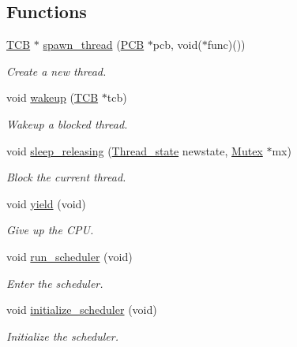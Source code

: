 \subsection*{Functions}
\begin{DoxyCompactItemize}
\item 
\hyperlink{group__scheduler_gaf88d9c946bf70b36a1e8bc34383abfc9}{T\-C\-B} $\ast$ \hyperlink{group__scheduler_ga34517ad777ad754965f80fe0248c16e5}{spawn\-\_\-thread} (\hyperlink{group__proc_gadf327f09ee935cf1734c14e8849f0421}{P\-C\-B} $\ast$pcb, void($\ast$func)())
\begin{DoxyCompactList}\small\item\em Create a new thread. \end{DoxyCompactList}\item 
void \hyperlink{group__scheduler_ga813d6e8ee69aed65bc5c317b99cfa51e}{wakeup} (\hyperlink{group__scheduler_gaf88d9c946bf70b36a1e8bc34383abfc9}{T\-C\-B} $\ast$tcb)
\begin{DoxyCompactList}\small\item\em Wakeup a blocked thread. \end{DoxyCompactList}\item 
void \hyperlink{group__scheduler_gae66dcfd964026bd58e91dc88db14b630}{sleep\-\_\-releasing} (\hyperlink{group__scheduler_ga6c969c169777f82c104cf73e501df70f}{Thread\-\_\-state} newstate, \hyperlink{group__syscalls_gaef2ec62cae8e0031fd19fc8b91083ade}{Mutex} $\ast$mx)
\begin{DoxyCompactList}\small\item\em Block the current thread. \end{DoxyCompactList}\item 
void \hyperlink{group__scheduler_ga7cb51f5c2b5cad3766f19eb69c92793b}{yield} (void)
\begin{DoxyCompactList}\small\item\em Give up the C\-P\-U. \end{DoxyCompactList}\item 
void \hyperlink{group__scheduler_ga147600b59d656eb9d9558673c2fad36d}{run\-\_\-scheduler} (void)
\begin{DoxyCompactList}\small\item\em Enter the scheduler. \end{DoxyCompactList}\item 
void \hyperlink{group__scheduler_ga244fb594301322e79d11a7844c759bba}{initialize\-\_\-scheduler} (void)
\begin{DoxyCompactList}\small\item\em Initialize the scheduler. \end{DoxyCompactList}\end{DoxyCompactItemize}
